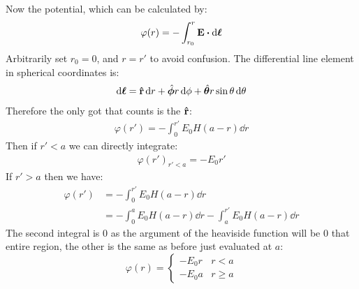 \documentclass[12pt]{article}
\begin{document}
Now the potential, which can be calculated by:
\begin{align*}
  \varphi(r)=-\int_{r_0}^r\vb{E}\vdot\dd{\bm{\ell}}
\end{align*}
Arbitrarily set $r_0=0$, and $r=r'$ to avoid confusion. The differential line element in spherical coordinates is:
\begin{align*}
  \dd{\bm{\ell}}=\vu{r}\dd{r}
  +\hat{\bm{\phi}}r\dd{\phi}
  +\hat{\bm{\theta}}r\sin\theta\dd{\theta}
\end{align*}
Therefore the only got that counts is the $\vu{r}$:
\begin{align*}
  \varphi(r')=-\int_0^{r'}E_0H(a-r)\dd{r}
\end{align*}
Then if $r'<a$ we can directly integrate:
\begin{align*}
  \varphi(r')_{r'<a}=-E_0r'
\end{align*}
If $r'>a$ then we have:
\begin{align*}
  \varphi(r')&=-\int_0^{r'}E_0H(a-r)\dd{r}\\
  &=-\int_0^aE_0H(a-r)\dd{r}-\int_a^{r'}E_0H(a-r)\dd{r}
\end{align*}
The second integral is $0$ as the argument of the heaviside function will be $0$ that entire region, the other is the same as before just evaluated at $a$:
\begin{equation}
  \boxed{
    \varphi(r)=
    \begin{cases}
      -E_0r & r<a \\
      -E_0a & r\geq a
    \end{cases}
  }
\end{equation}
\newpage
\end{document}
